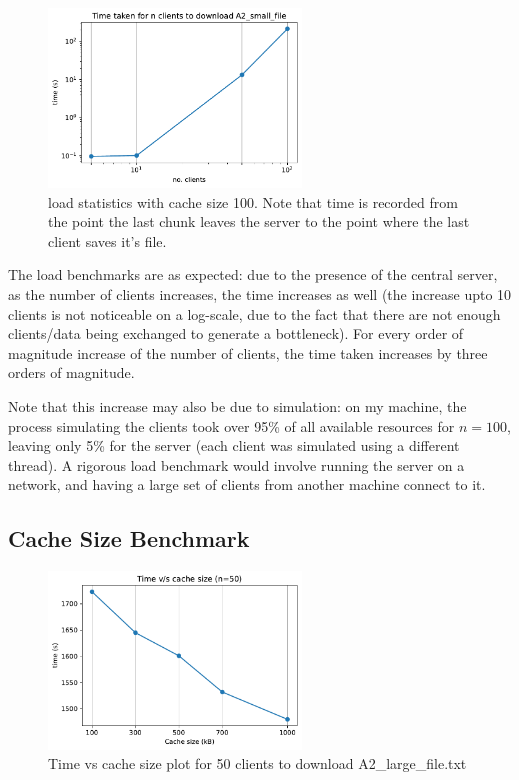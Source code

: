 \documentclass[12pt]{article}
\begin{document}
\begin{figure}[H]
  \centering
  \includegraphics[width=0.6\textwidth]{time_clients.pdf}
  \caption{load statistics with cache size 100. Note that time is recorded from the point the last chunk leaves the server to the point where the last client saves it's file.}
\end{figure}

The load benchmarks are as expected: due to the presence of the central server, as the number of clients increases, the time increases as well (the increase upto 10 clients is not noticeable on a log-scale, due to the fact that there are not enough clients/data being exchanged to generate a bottleneck). For every order of magnitude increase of the number of clients, the time taken increases by three orders of magnitude. 

Note that this increase may also be due to simulation: on my machine, the process simulating the clients took over 95\% of all available resources for $n=100$, leaving only 5\% for the server (each client was simulated using a different thread). A rigorous load benchmark would involve running the server on a network, and having a large set of clients from another machine connect to it.

\subsection{Cache Size Benchmark}

\begin{figure}[H]
  \centering
  \includegraphics[width=0.6\textwidth]{time_cache.pdf}
  \caption{Time vs cache size plot for 50 clients to download A2\_large\_file.txt}
\end{figure}
\end{document}
